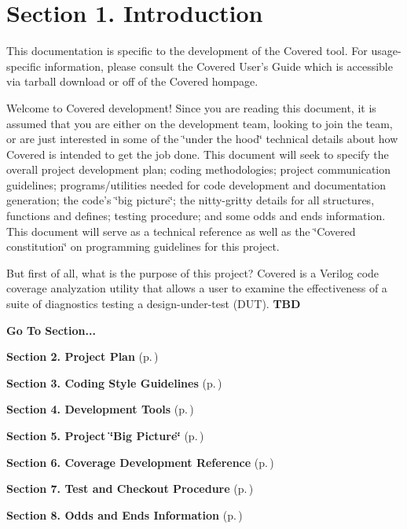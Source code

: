 \section{Section 1.  Introduction}\label{page_intro}
 

 This documentation is specific to the development of the Covered tool. For usage-specific information, please consult the Covered User's Guide which is accessible via tarball download or off of the Covered hompage.

 Welcome to Covered development! Since you are reading this document, it is assumed that you are either on the development team, looking to join the team, or are just interested in some of the \char`\"{}under the hood\char`\"{} technical details about how Covered is intended to get the job done. This document will seek to specify the overall project development plan; coding methodologies; project communication guidelines; programs/utilities needed for code development and documentation generation; the code's \char`\"{}big picture\char`\"{}; the nitty-gritty  details for all structures, functions and defines; testing procedure; and some odds and  ends information. This document will serve as a technical reference as well as the  \char`\"{}Covered constitution\char`\"{} on programming guidelines for this project.

 But first of all, what is the purpose of this project? Covered is a Verilog code coverage  analyzation utility that allows a user to examine the effectiveness of a suite of diagnostics testing a design-under-test (DUT). {\bf TBD}



\begin{Desc}
\item[{\bf Go To Section...}]\par
\begin{CompactItemize}
\item 
{\bf Section 2.  Project Plan} {\rm (p.\,\pageref{page_project_plan})}\item 
{\bf Section 3.  Coding Style Guidelines} {\rm (p.\,\pageref{page_code_style})}\item 
{\bf Section 4.  Development Tools} {\rm (p.\,\pageref{page_tools})}\item 
{\bf Section 5.  Project \char`\"{}Big Picture\char`\"{}} {\rm (p.\,\pageref{page_big_picture})}\item 
{\bf Section 6.  Coverage Development Reference} {\rm (p.\,\pageref{page_code_details})}\item 
{\bf Section 7.  Test and Checkout Procedure} {\rm (p.\,\pageref{page_testing})}\item 
{\bf Section 8.  Odds and Ends Information} {\rm (p.\,\pageref{page_misc})}\end{CompactItemize}
\end{Desc}
